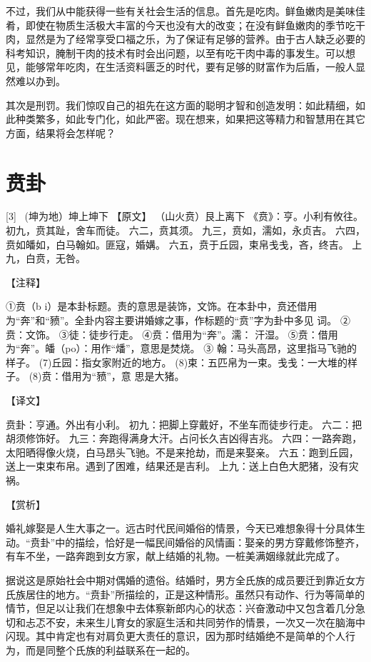 \documentclass[12pt,UTF8]{ctexbook}
\begin{document}
不过，我们从中能获得一些有关社会生活的信息。首先是吃肉。鲜鱼嫩肉是美味佳肴，即使在物质生活极大丰富的今天也没有大的改变；在没有鲜鱼嫩肉的季节吃干肉，显然是为了经常享受口福之乐，为了保证有足够的营养。由于古人缺乏必要的科考知识，腌制干肉的技术有时会出问题，以至有吃干肉中毒的事发生。可以想见，能够常年吃肉，在生活资料匮乏的时代，要有足够的财富作为后盾，一般人显然难以办到。

其次是刑罚。我们惊叹自己的祖先在这方面的聪明才智和创造发明：如此精细，如此种类繁多，如此专门化，如此严密。现在想来，如果把这等精力和智慧用在其它方面，结果将会怎样呢？

\chapter{贲卦}
[3] \ (坤为地）坤上坤下
【原文】
（山火贲）艮上离下
《贲》：亨。小利有攸往。
初九，贲其趾，舍车而徒。
六二，贲其须。
九三，贲如，濡如，永贞吉。
六四，贲如皤如，白马翰如。匪寇，婚媾。
六五，贲于丘园，束帛戋戋，吝，终吉。
上九，白贲，无咎。

【注释】

①贲（b i）是本卦标题。责的意思是装饰，文饰。在本卦中，贲还借用为“奔”和“豮”。全卦内容主要讲婚嫁之事，作标题的“贲”字为卦中多见 词。
②贲：文饰。
③徒：徒步行走。
④贲：借用为“奔”。濡： 汗湿。
⑤贲：借用为“奔”。皤（po）：用作“燔”，意思是焚烧。
③ 翰：马头高昂，这里指马飞驰的样子。
(7)丘园：指女家附近的地方。
(8)束：五匹帛为一束。戋戋：一大堆的样子。
(8)贲：借用为“豮”，意 思是大猪。

【译文】

贲卦：亨通。外出有小利。
初九：把脚上穿戴好，不坐车而徒步行走。
六二：把胡须修饰好。
九三：奔跑得满身大汗。占问长久吉凶得吉兆。
六四：一路奔跑，太阳晒得像火烧，白马昂头飞驰。不是来抢劫，而是来娶亲。
六五：跑到丘园，送上一束束布帛。遇到了困难，结果还是吉利。
上九：送上白色大肥猪，没有灾祸。

【赏析】

婚礼嫁娶是人生大事之一。远古时代民间婚俗的情景，今天已难想象得十分具体生动。“贲卦”中的描绘，恰好是一幅民间婚俗的风情画：娶亲的男方穿戴修饰整齐，有车不坐，一路奔跑到女方家，献上结婚的礼物。一桩美满姻缘就此完成了。

据说这是原始社会中期对偶婚的遗俗。结婚时，男方全氏族的成员要迁到靠近女方氏族居住的地方。“贲卦”所描绘的，正是这种情形。虽然只有动作、行为等简单的情节，但足以让我们在想象中去体察新郎内心的状态：兴奋激动中又包含着几分急切和忐忑不安，未来生儿育女的家庭生活和共同劳作的情景，一次又一次在脑海中闪现。其中肯定也有对肩负更大责任的意识，因为那时结婚绝不是简单的个人行为，而是同整个氏族的利益联系在一起的。
\end{document}
